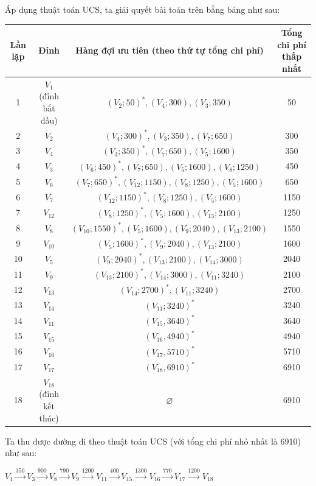 \documentclass[a4paper, 11pt]{article}
\let\emptyset\varnothing
\begin{document}
Áp dụng thuật toán UCS, ta giải quyết bài toán trên bằng bảng như sau:
\begin{center}
    \begin{tabular}{ |c|c|c|c| }
        \hline
        Lần lặp & Đỉnh & Hàng đợi ưu tiên (theo thứ tự tổng chi phí) & Tổng chi phí thấp nhất \\
        \hline
        1 & $V_{1}$ (đỉnh bắt đầu) & $(V_{2}; 50)^*, (V_{4}; 300), (V_{3}; 350)$ & 50 \\
        \hline
        2 & $V_{2}$ & $(V_{4}; 300)^*, (V_{3}; 350), (V_{7}; 650)$ & 300 \\
        \hline
        3 & $V_{4}$ & $(V_{3}; 350)^*, (V_{7}; 650), (V_{5}; 1600)$ & 350 \\
        \hline
        4 & $V_{3}$ & $(V_{6}; 450)^*, (V_{7}; 650), (V_{5}; 1600), (V_{8}; 1250)$  & 450 \\
        \hline
        5 & $V_{6}$ & $(V_{7}; 650)^*, (V_{12}; 1150), (V_{8}; 1250), (V_{5}; 1600)$ & 650 \\
        \hline
        6 & $V_{7}$ & $(V_{12}; 1150)^*, (V_{8}; 1250), (V_{5}; 1600)$ & 1150 \\
        \hline
        7 & $V_{12}$ & $(V_{8}; 1250)^*, (V_{5}; 1600), (V_{13}; 2100)$ & 1250 \\
        \hline
        8 & $V_{8}$ & $(V_{10}; 1550)^*, (V_{5}; 1600), (V_{9}; 2040), (V_{13}; 2100)$ & 1550\\
        \hline
        9 & $V_{10}$ & $(V_{5}; 1600)^*, (V_{9}; 2040), (V_{13}; 2100)$ & 1600 \\
        \hline
        10 & $V_{5}$ & $(V_{9}; 2040)^*, (V_{13}; 2100), (V_{14}; 3000)$ & 2040 \\
        \hline
        11 & $V_{9}$ & $(V_{13}; 2100)^*, (V_{14}; 3000), (V_{11}; 3240)$ & 2100 \\
        \hline
        12 & $V_{13}$ & $(V_{14}; 2700)^*, (V_{11}; 3240)$ & 2700 \\
        \hline
        13 & $V_{14}$ & $(V_{11}; 3240)^*$ & 3240 \\
        \hline
        14 & $V_{11}$ & $(V_{15}, 3640)^*$ & 3640 \\
        \hline
        15 & $V_{15}$ & $(V_{16}, 4940)^*$ & 4940 \\
        \hline
        16 & $V_{16}$ & $(V_{17}, 5710)^*$ & 5710 \\
        \hline
        17 & $V_{17}$& $(V_{18}, 6910)^*$ & 6910 \\
        \hline
        18 & $V_{18}$ (đỉnh kết thúc) & $\emptyset$ & 6910 \\
        \hline
    \end{tabular}
\end{center}
Ta thu được đường đi theo thuật toán UCS (với tổng chi phí nhỏ nhất là 6910) như sau:
\begin{center}
    $V_{1} \xrightarrow{350} V_{3} \xrightarrow{900} V_{8} \xrightarrow{790} V_{9} \xrightarrow{1200} V_{11} \xrightarrow{400} V_{15} \xrightarrow{1300} V_{16} \xrightarrow{770} V_{17} \xrightarrow{1200} V_{18}$
\end{center}
\clearpage
\end{document}

